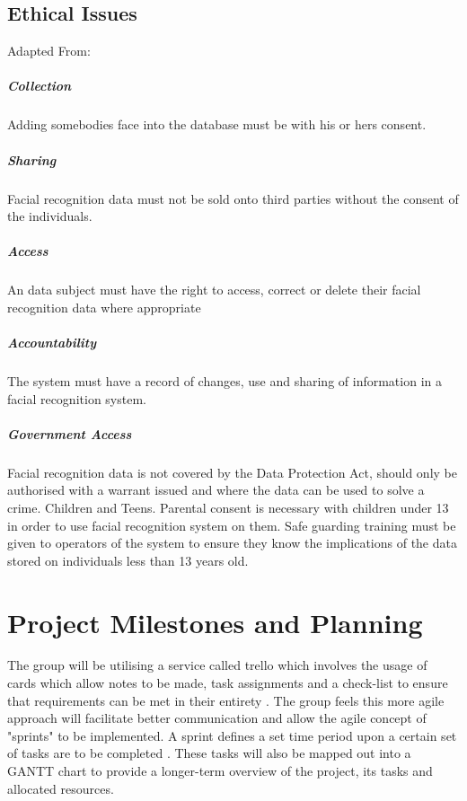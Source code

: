 \documentclass[11pt]{report}
\begin{document}
\subsection{Ethical Issues}
Adapted From: \citep{privacy1}
\subparagraph{Collection}
Adding somebodies face into the database must be with his or hers consent. 
\subparagraph{Sharing}
Facial recognition data must not be sold onto third parties without the consent of the individuals.
\subparagraph{Access}
An data subject must have the right to access, correct or delete their facial recognition data where appropriate
\subparagraph{Accountability}
The system must have a record of changes, use and sharing of information in a facial recognition system.
\subparagraph{Government Access}
Facial recognition data is not covered by the Data Protection Act, should only be authorised with a warrant issued and where the data can be used to solve a crime.
Children and Teens. 
Parental consent is necessary with children under 13 in order to use facial recognition system on them. Safe guarding training must be given to operators of the system to ensure they know the implications of the data stored on individuals less than 13 years old. 

\section{Project Milestones and Planning}
The group will be utilising a service called trello which involves the usage of cards which allow notes to be made, task assignments and a check-list to ensure that requirements can be met in their entirety \citep{trello}. The group feels this more agile approach will facilitate better communication and allow the agile concept of "sprints" to be implemented. A sprint defines a set time period upon a certain set of tasks are to be completed \citep{sprint}. These tasks will also be mapped out into a GANTT chart to provide a longer-term overview of the project, its tasks and allocated resources.



\end{document}

